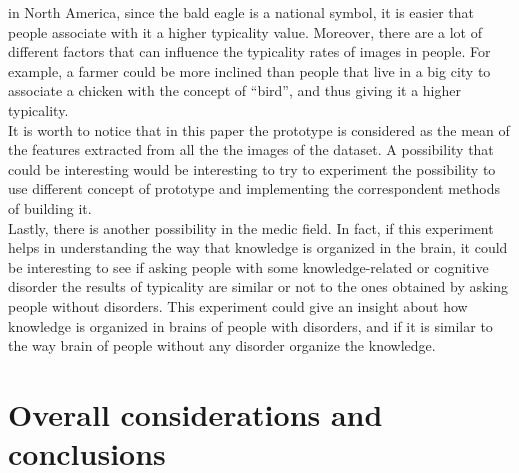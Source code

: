 \documentclass[conference]{IEEEtran}
\begin{document}
			in North America, since the bald eagle is a national symbol, it is easier that people associate with it a higher typicality value. Moreover, there are a lot of different factors that can influence 
			the typicality rates of images in people. For example, a farmer could be more inclined than people that live in a big city to associate a chicken with the concept of ``bird'', and thus giving 
			it a higher typicality.\\
			It is worth to notice that in this paper the prototype is considered as the mean of the features extracted from all the the images of the dataset. A possibility that could be interesting would be 
			interesting to try to experiment the possibility to use different concept of prototype and implementing the correspondent methods of building it.\\
			Lastly, there is another possibility in the medic field. In fact, if this experiment helps in understanding the way that knowledge is organized in the brain, it could be interesting to see if 
			asking people with some knowledge-related or cognitive disorder the results of typicality are similar or not to the ones obtained by asking people without disorders. This experiment could give 
			an insight about how knowledge is organized in brains of people with disorders, and if it is similar to the way brain of people without any disorder organize the knowledge. 
	
	\section{Overall considerations and conclusions}
	
\end{document}
